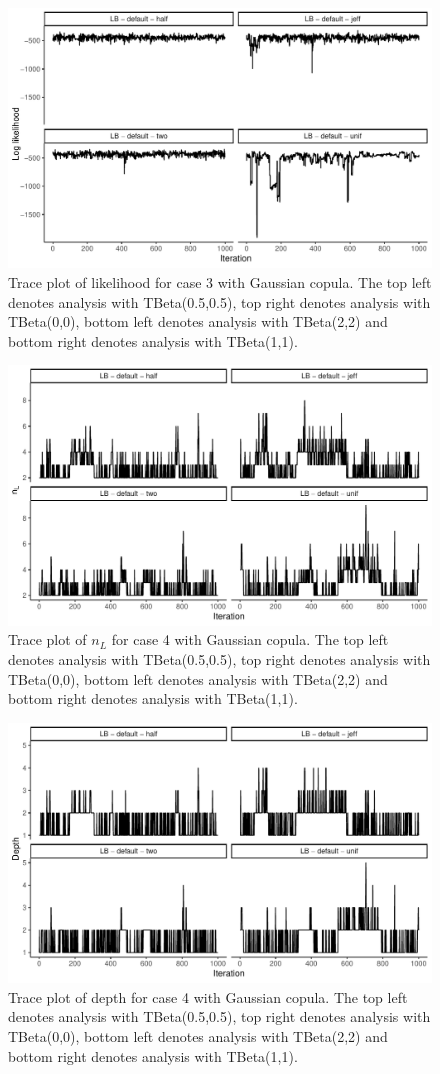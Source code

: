 \documentclass{amsart}
\begin{document}
\begin{figure}
	\centering
	\includegraphics[width = 0.75\linewidth]{trace_case3_gauss_like.pdf}
	\caption{Trace plot of likelihood for case 3 with Gaussian copula. The top left denotes analysis with TBeta(0.5,0.5), top right denotes analysis with TBeta(0,0), bottom left denotes analysis with TBeta(2,2) and bottom right denotes analysis with TBeta(1,1).}
	\label{fig:case3:gauss:like}
\end{figure}

\begin{figure}
	\centering
	\includegraphics[width = 0.75\linewidth]{trace_case4_gauss_nterm.pdf}
	\caption{Trace plot of $n_L$ for case 4 with Gaussian copula. The top left denotes analysis with TBeta(0.5,0.5), top right denotes analysis with TBeta(0,0), bottom left denotes analysis with TBeta(2,2) and bottom right denotes analysis with TBeta(1,1).}
	\label{fig:case4:gauss:nterm}
\end{figure}

\begin{figure}
	\centering
	\includegraphics[width = 0.75\linewidth]{trace_case4_gauss_depth.pdf}
	\caption{Trace plot of depth for case 4 with Gaussian copula. The top left denotes analysis with TBeta(0.5,0.5), top right denotes analysis with TBeta(0,0), bottom left denotes analysis with TBeta(2,2) and bottom right denotes analysis with TBeta(1,1).}
	\label{fig:case4:gauss:depth}
\end{figure}
\end{document}
